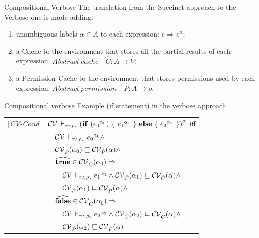 \documentclass[11pt]{beamer}
\begin{document}
\newcommand{\genl}[1]{\mathcal{C}_{*\rho_s}\llbracket (#1)^\all \rrbracket}
\newcommand{\gen}[1]{\mathcal{C}_{*\rho_s}\llbracket (#1) \rrbracket}
\newcommand{\Cel}{\mathsf{C}}
\newcommand{\Rel}{\mathsf{\Gamma}}
\newcommand{\Pel}{\mathsf{P}}
\newcommand{\Mel}{\mathsf{M}}
\newcommand{\El}{\mathsf{E}}
\newcommand{\Upsel}{\mathsf{\Upsilon}}
\newcommand{\Phiel}{\mathsf{\Phi}}
\newcommand{\braces}[1]{\{ #1 \} }
\newcommand{\parens}[1]{\( #1 \) }

\begin{frame}{Compositional Verbose}
The translation from the Succinct approach to the Verbose one is made adding:
\begin{enumerate}
\item unambiguous labels $\alpha \in A$ to each expression: $e \Rightarrow e^\alpha$;
\item a Cache to the environment that stores all the partial results of each expression: $\mathit{Abstract\ cache} \quad \hat{C} : A \rightarrow \hat{V}$;
\item a Permission Cache to the environment that stores permissions used by each expression: $\mathit{Abstract\ permission} \quad \hat{P} : A \rightarrow \rho$.
\end{enumerate}
\end{frame}

\begin{frame}{Compositional verbose}
Example (if statement) in the verbose approach
\begin{tabular}{l l}%
[\textit{CV-Cond}]&$\mathcal{CV} \Vdash_{cv, \rho_s} {(\mathbf{if}\ ({e_0}^{\alpha_0})\ \{\ {e_1}^{\alpha_1}\ \}\ \mathbf{else}\ \{\ {e_2}^{\alpha_2}\ \})}^{\alpha} $ iff\\
&$\quad \mathcal{CV} \Vdash_{cv, \rho_s} {e_0}^{\alpha_0} \wedge $\\
&$\quad \mathcal{CV}_{\hat{P}}(\alpha_{0}) \sqsubseteq \mathcal{CV}_{\hat{P}}(\alpha) \wedge$ \\
&$\quad \widehat{\mathbf{true}} \in \mathcal{CV}_{\hat{C}}(\alpha_0) \Rightarrow$\\
&$\qquad\mathcal{CV} \Vdash_{cv, \rho_s} {e_1}^{\alpha_1} \wedge \mathcal{CV}_{\hat{C}}(\alpha_1) \sqsubseteq \mathcal{CV}_{\hat{C}}(\alpha)\wedge$\\
&$\qquad\mathcal{CV}_{\hat{P}}(\alpha_1) \sqsubseteq \mathcal{CV}_{\hat{P}}(\alpha) \wedge$ \\
&$\quad \widehat{\mathbf{false}} \in \mathcal{CV}_{\hat{C}}(\alpha_0) \Rightarrow$\\
&$\qquad\mathcal{CV} \Vdash_{cv, \rho_s} {e_2}^{\alpha_2} \wedge \mathcal{CV}_{\hat{C}}(\alpha_2) \sqsubseteq \mathcal{CV}_{\hat{C}}(\alpha) \wedge$\\
&$\qquad\mathcal{CV}_{\hat{P}}(\alpha_2) \sqsubseteq \mathcal{CV}_{\hat{P}}(\alpha)$ \\
\end{tabular}
\end{frame}
\end{document}
